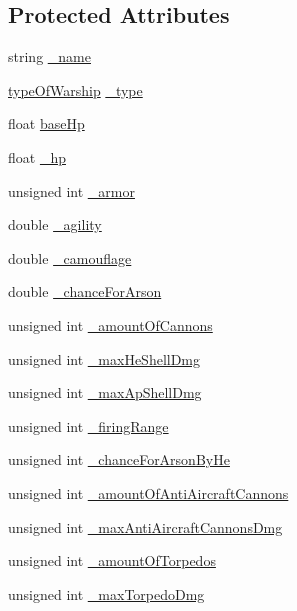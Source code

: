 \subsection*{Protected Attributes}
\begin{DoxyCompactItemize}
\item 
string \hyperlink{class_ship_a68cf161799aadcbbe1c7b28b9dd10849}{\+\_\+name}
\item 
\hyperlink{_functions_8h_ac7cd30cb79c1068579276e4cb287a2a7}{type\+Of\+Warship} \hyperlink{class_ship_a5a32460ba76649a09aa9c9d4df332217}{\+\_\+type}
\item 
float \hyperlink{class_ship_af95a5ee3b4f3ffc4ab069a5dce7baa16}{base\+Hp}
\item 
float \hyperlink{class_ship_a2651d11a4926fe1b2eb65883565e8bd3}{\+\_\+hp}
\item 
unsigned int \hyperlink{class_ship_ac47a2f3ff405ca582bb0eb40c656c0e3}{\+\_\+armor}
\item 
double \hyperlink{class_ship_a28defb88168c7f977ae06a023a2de772}{\+\_\+agility}
\item 
double \hyperlink{class_ship_aa0df6c32a4745b65ba7bb0ed4368f15e}{\+\_\+camouflage}
\item 
double \hyperlink{class_ship_ae77c4ff11f205f30804f750e36a956ab}{\+\_\+chance\+For\+Arson}
\item 
unsigned int \hyperlink{class_ship_a347e40d66fe5a0282309ffd280d5f596}{\+\_\+amount\+Of\+Cannons}
\item 
unsigned int \hyperlink{class_ship_ab24d3443c476283386c89754fd433670}{\+\_\+max\+He\+Shell\+Dmg}
\item 
unsigned int \hyperlink{class_ship_aa936c394b1cc8f19cb4e5d66a7223e63}{\+\_\+max\+Ap\+Shell\+Dmg}
\item 
unsigned int \hyperlink{class_ship_a070c1763b821ed7ba50931558283e82c}{\+\_\+firing\+Range}
\item 
unsigned int \hyperlink{class_ship_a5ae7f8df8dec0c92ce8f778e37c0fafb}{\+\_\+chance\+For\+Arson\+By\+He}
\item 
unsigned int \hyperlink{class_ship_ac6b6499ae6b669db54cbd640e9bba7ec}{\+\_\+amount\+Of\+Anti\+Aircraft\+Cannons}
\item 
unsigned int \hyperlink{class_ship_a30a5533d9feec6fea05ae3b9472361b6}{\+\_\+max\+Anti\+Aircraft\+Cannons\+Dmg}
\item 
unsigned int \hyperlink{class_ship_aeb1a24d770dc9dc85c5b4a70bf5bbff5}{\+\_\+amount\+Of\+Torpedos}
\item 
unsigned int \hyperlink{class_ship_adc1f7e5d7b3db9420ce78c81ba7d64f1}{\+\_\+max\+Torpedo\+Dmg}

\end{DoxyCompactItemize}
